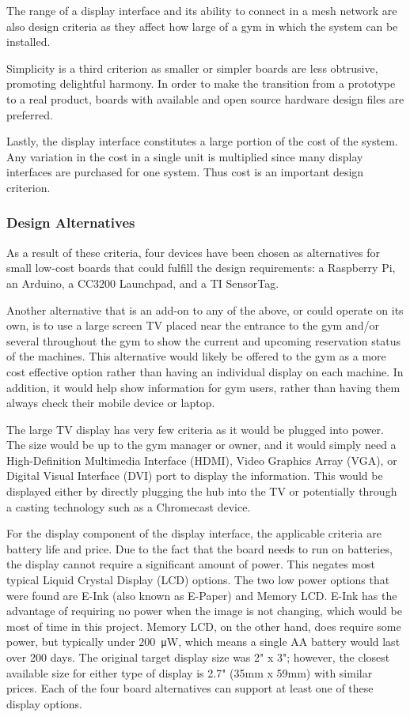 \documentclass[PPFS.tex]{template/subfiles}
\begin{document}
The range of a display interface and its ability to connect in a mesh network are also design criteria as they affect how large of a gym in which the system can be installed.

Simplicity is a third criterion as smaller or simpler boards are less obtrusive, promoting delightful harmony. In order to make the transition from a prototype to a real product, boards with available and open source hardware design files are preferred.

Lastly, the display interface constitutes a large portion of the cost of the system. Any variation in the cost in a single unit is multiplied since many display interfaces are purchased for one system. Thus cost is an important design criterion.

\subsubsection{Design Alternatives}

As a result of these criteria, four devices have been chosen as alternatives for small low-cost boards that could fulfill the design requirements: a Raspberry Pi, an Arduino, a CC3200 Launchpad, and a TI SensorTag. 

Another alternative that is an add-on to any of the above, or could operate on its own, is to use a large screen TV placed near the entrance to the gym and/or several throughout the gym to show the current and upcoming reservation status of the machines. This alternative would likely be offered to the gym as a more cost effective option rather than having an individual display on each machine. In addition, it would help show information for gym users, rather than having them always check their mobile device or laptop.

The large TV display has very few criteria as it would be plugged into power. The size would be up to the gym manager or owner, and it would simply need a High-Definition Multimedia Interface (HDMI), Video Graphics Array (VGA), or Digital Visual Interface (DVI) port to display the information. This would be displayed either by directly plugging the hub into the TV or potentially through a casting technology such as a Chromecast device.

For the display component of the display interface, the applicable criteria are battery life and price. Due to the fact that the board needs to run on batteries, the display cannot require a significant amount of power. This negates most typical Liquid Crystal Display (LCD) options. The two low power options that were found are E-Ink (also known as E-Paper) and Memory LCD. E-Ink has the advantage of requiring no power when the image is not changing, which would be most of time in this project. Memory LCD, on the other hand, does require some power, but typically under \SI{200}{\micro\watt}, which means a single AA battery would last over 200 days. The original target display size was 2" x 3"; however, the closest available size for either type of display is 2.7" (35mm x 59mm) with similar prices. Each of the four board alternatives can support at least one of these display options.
\end{document}
